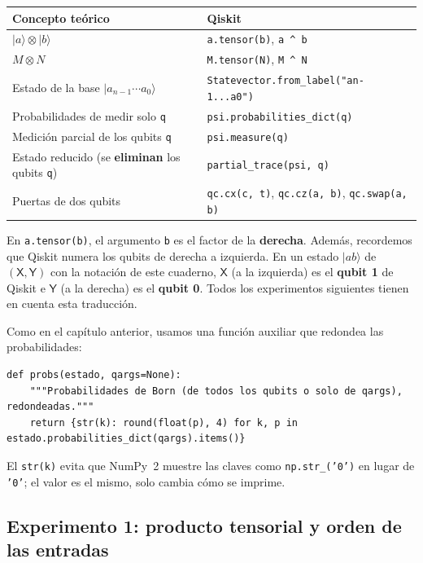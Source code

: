 \documentclass[11pt, a4paper, twoside, openright]{report}
\begin{document}
\begin{center}\small
\begin{tabular}{l|l}
\textbf{Concepto teórico} & \textbf{Qiskit} \\ \hline
$|a\rangle\otimes|b\rangle$ & \texttt{a.tensor(b)}, \texttt{a \^{} b} \\
$M\otimes N$ & \texttt{M.tensor(N)}, \texttt{M \^{} N} \\
Estado de la base $|a_{n-1}\cdots a_0\rangle$ & \texttt{Statevector.from\_label("an-1...a0")} \\
Probabilidades de medir solo \texttt{q} & \texttt{psi.probabilities\_dict(q)} \\
Medición parcial de los qubits \texttt{q} & \texttt{psi.measure(q)} \\
Estado reducido (se \textbf{eliminan} los qubits \texttt{q}) & \texttt{partial\_trace(psi, q)} \\
Puertas de dos qubits & \texttt{qc.cx(c, t)}, \texttt{qc.cz(a, b)}, \texttt{qc.swap(a, b)}
\end{tabular}
\end{center}

\noindent En \texttt{a.tensor(b)}, el argumento \texttt{b} es el factor de la \textbf{derecha}. Además, recordemos que Qiskit numera los qubits de derecha a izquierda. En un estado $|ab\rangle$ de $(\mathsf{X},\mathsf{Y})$ con la notación de este cuaderno, $\mathsf{X}$ (a la izquierda) es el \textbf{qubit 1} de Qiskit e $\mathsf{Y}$ (a la derecha) es el \textbf{qubit 0}. Todos los experimentos siguientes tienen en cuenta esta traducción.

\noindent Como en el capítulo anterior, usamos una función auxiliar que redondea las probabilidades:
\begin{lstlisting}
def probs(estado, qargs=None):
    """Probabilidades de Born (de todos los qubits o solo de qargs), redondeadas."""
    return {str(k): round(float(p), 4) for k, p in estado.probabilities_dict(qargs).items()}
\end{lstlisting}
\noindent El \texttt{str(k)} evita que NumPy~2 muestre las claves como \texttt{np.str\_('0')} en lugar de \texttt{'0'}; el valor es el mismo, solo cambia cómo se imprime.

\subsection{Experimento 1: producto tensorial y orden de las entradas}
\end{document}
